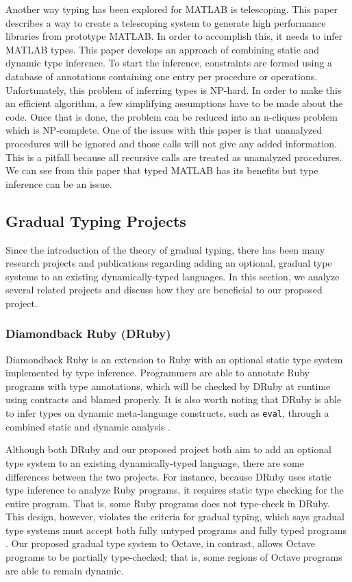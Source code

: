 Another way typing has been explored for MATLAB is telescoping. This paper \cite{chauhan2003type} describes a way to create a telescoping system to generate high performance libraries from prototype MATLAB. In order to accomplish this, it needs to infer MATLAB types. This paper develops an approach of combining static and dynamic type inference. To start the inference, constraints are formed using a database of annotations containing one entry per procedure or operations. Unfortunately, this problem of inferring types is NP-hard. In order to make this an efficient algorithm, a few simplifying assumptions have to be made about the code. Once that is done, the problem can be reduced into an n-cliques problem which is NP-complete. One of the issues with this paper is that unanalyzed procedures will be ignored and those calls will not give any added information. This is a pitfall because all recursive calls are treated as unanalyzed procedures. We can see from this paper that typed MATLAB has its benefits but type inference can be an issue.

\subsection{Gradual Typing Projects}
Since the introduction of the theory of gradual typing, there has been many research projects and publications regarding adding an optional, gradual type systems to an existing dynamically-typed languages. In this section, we analyze several related projects and discuss how they are beneficial to our proposed project.

\subsubsection{Diamondback Ruby (DRuby) \cite{furr2009combining}}
Diamondback Ruby is an extension to Ruby with an optional static type system implemented by type inference. Programmers are able to annotate Ruby programs with type annotations, which will be checked by DRuby at runtime using contracts and blamed properly. It is also worth noting that DRuby is able to infer types on dynamic meta-language constructs, such as {\tt eval}, through a combined static and dynamic analysis \cite{druby}.

Although both DRuby and our proposed project both aim to add an optional type system to an existing dynamically-typed language, there are some differences between the two projects. For instance, because DRuby uses static type inference to analyze Ruby programs, it requires static type checking for the entire program. That is, some Ruby programs does not type-check in DRuby. This design, however, violates the criteria for gradual typing, which says gradual type systems must accept both fully untyped programs and fully typed programs \cite{siek2015refined}.  Our proposed gradual type system to Octave, in contrast, allows Octave programs to be partially type-checked; that is, some regions of Octave programs are able to remain dynamic.

